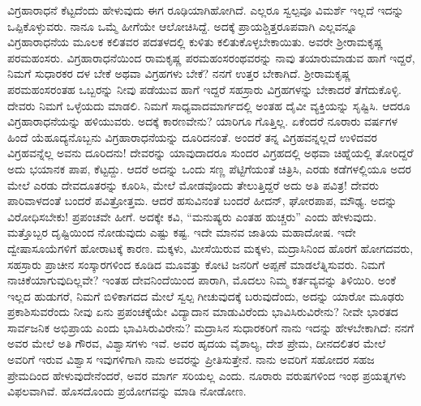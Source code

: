 ವಿಗ್ರಹಾರಾಧನೆ ಕೆಟ್ಟದೆಂದು ಹೇಳುವುದು ಈಗ ರೂಢಿಯಾಗಿಹೋಗಿದೆ. ಎಲ್ಲರೂ ಸ್ವಲ್ಪವೂ ವಿಮರ್ಶೆ ಇಲ್ಲದೆ ಇದನ್ನು ಒಪ್ಪಿಕೊಳ್ಳುವರು. ನಾನೂ ಒಮ್ಮೆ ಹೀಗೆಯೇ ಆಲೋಚಿಸಿದ್ದೆ. ಅದಕ್ಕೆ ಪ್ರಾಯಶ್ಚಿತ್ತರೂಪವಾಗಿ ಎಲ್ಲವನ್ನೂ ವಿಗ್ರಹಾ\-ರಾಧನೆಯ ಮೂಲಕ ಕಲಿತವರ ಪದತಳದಲ್ಲಿ ಕುಳಿತು ಕಲಿತುಕೊಳ್ಳಬೇಕಾಯಿತು. ಅವರೇ ಶ‍್ರೀರಾಮಕೃಷ್ಣ ಪರಮಹಂಸರು. ವಿಗ್ರಹಾರಾಧನೆ\-ಯಿಂದ ರಾಮಕೃಷ್ಣ ಪರಮಹಂಸರಂಥವರನ್ನು ನಾವು ತಯಾರುಮಾಡುವ ಹಾಗೆ ಇದ್ದರೆ, ನಿಮಗೆ ಸುಧಾರಕರ ದಳ ಬೇಕೆ ಅಥವಾ ವಿಗ್ರಹಗಳು ಬೇಕೆ? ನನಗೆ ಉತ್ತರ ಬೇಕಾಗಿದೆ. ಶ‍್ರೀರಾಮಕೃಷ್ಣ ಪರಮಹಂಸರಂತಹ ಒಬ್ಬರನ್ನು ನೀವು ಪಡೆಯುವ ಹಾಗೆ ಇದ್ದರೆ ಸಹಸ್ರಾರು ವಿಗ್ರಹಗಳನ್ನು ಬೇಕಾದರೆ ತೆಗೆದು\-ಕೊಳ್ಳಿ. ದೇವರು ನಿಮಗೆ ಒಳ್ಳೆಯದು ಮಾಡಲಿ. ನಿಮಗೆ ಸಾಧ್ಯವಾದ\break ಮಾರ್ಗದಲ್ಲಿ ಅಂತಹ ದೈವೀ ವ್ಯಕ್ತಿಯನ್ನು ಸೃಷ್ಟಿಸಿ. ಆದರೂ ವಿಗ್ರಹಾರಾಧನೆ\-ಯನ್ನು ಹಳಿಯುವರು. ಅದಕ್ಕೆ ಕಾರಣವೇನು? ಯಾರಿಗೂ ಗೊತ್ತಿಲ್ಲ. ಏಕೆಂದರೆ ನೂರಾರು ವರ್ಷಗಳ ಹಿಂದೆ ಯೆಹೂದ್ಯನೊಬ್ಬನು ವಿಗ್ರಹಾರಾಧನೆಯನ್ನು ದೂರಿದನಂತೆ. ಅಂದರೆ ತನ್ನ ವಿಗ್ರಹವನ್ನಲ್ಲದೆ ಉಳಿದವರ ವಿಗ್ರಹವನ್ನೆಲ್ಲ ಅವನು ದೂರಿದನು! ದೇವರನ್ನು ಯಾವುದಾದರೂ ಸುಂದರ ವಿಗ್ರಹದಲ್ಲಿ ಅಥವಾ ಚಿಹ್ನೆಯಲ್ಲಿ ತೋರಿದ್ದರೆ ಅದು ಭಯಾನಕ ಪಾಪ, ಕೆಟ್ಟದ್ದು. ಆದರೆ ಅದನ್ನು ಒಂದು ಸಣ್ಣ ಪೆಟ್ಟಿಗೆಯಂತೆ ಚಿತ್ರಿಸಿ, ಎರಡು ಕಡೆಗಳಲ್ಲಿಯೂ ಅದರ ಮೇಲೆ ಎರಡು ದೇವದೂತರನ್ನು ಕೂರಿಸಿ, ಮೇಲೆ ಮೋಡವೊಂದು ತೇಲುತ್ತಿದ್ದರೆ ಅದು ಅತಿ ಪವಿತ್ರ! ದೇವರು ಪಾರಿವಾಳದಂತೆ ಬಂದರೆ ಪವಿತ್ರೋತ್ತಮ. ಆದರೆ ಹಸುವಿನಂತೆ ಬಂದರೆ ಹೀದನ್​, ಘೋರಪಾಪ, ಮೌಢ್ಯ. ಅದನ್ನು ವಿರೋಧಿಸಬೇಕು! ಪ್ರಪಂಚವೇ ಹೀಗೆ. ಅದಕ್ಕೇ ಕವಿ, “ಮನುಷ್ಯರು ಎಂತಹ ಹುಚ್ಚರು” ಎಂದು ಹೇಳುವುದು. ಮತ್ತೊಬ್ಬರ ದೃಷ್ಟಿಯಿಂದ ನೋಡುವುದು ಎಷ್ಟು ಕಷ್ಟ. ಇದೇ ಮಾನವ ಜಾತಿಯ ಮಹಾದೋಷ. ಇದೇ ದ್ವೇಷಾಸೂಯೆಗಳಿಗೆ ಹೋರಾಟಕ್ಕೆ ಕಾರಣ. ಮಕ್ಕಳು, ಮೀಸೆಯಿರುವ ಮಕ್ಕಳು, ಮದ್ರಾಸಿನಿಂದ ಹೊರಗೆ ಹೋಗದವರು, ಸಹಸ್ರಾರು ಪ್ರಾಚೀನ ಸಂಸ್ಕಾರಗಳಿಂದ ಕೂಡಿದ ಮೂವತ್ತು ಕೋಟಿ ಜನರಿಗೆ ಅಪ್ಪಣೆ ಮಾಡಲೆತ್ನಿಸುವರು. ನಿಮಗೆ ನಾಚಿಕೆ\-ಯಾಗುವುದಿಲ್ಲವೇ? ಇಂತಹ ದೇವನಿಂದೆಯಿಂದ ಪಾರಾಗಿ, ಮೊದಲು ನಿಮ್ಮ ಕರ್ತವ್ಯವನ್ನು ತಿಳಿಯಿರಿ. ಅಂಕೆ ಇಲ್ಲದ ಹುಡುಗರೆ, ನಿಮಗೆ ಬಿಳಿಕಾಗದದ ಮೇಲೆ ಸ್ವಲ್ಪ ಗೀಚುವುದಕ್ಕೆ ಬರುವುದೆಂದು, ಅದನ್ನು ಯಾರೋ ಮೂಢರು ಪ್ರಕಾಶಿಸುವರೆಂದು ನೀವು ಏನು ಪ್ರಪಂಚಕ್ಕೆಯೇ ವಿದ್ಯಾದಾನ ಮಾಡುವಿರೆಂದು ಭಾವಿಸಿರುವಿರೇನು? ನೀವೇ ಭಾರತದ ಸಾರ್ವಜನಿಕ ಅಭಿಪ್ರಾಯ ಎಂದು ಭಾವಿಸಿರುವಿರೇನು? ಮದ್ರಾಸಿನ ಸುಧಾರಕರಿಗೆ ನಾನು ಇದನ್ನು ಹೇಳಬೇಕಾಗಿದೆ: ನನಗೆ ಅವರ ಮೇಲೆ ಅತಿ ಗೌರವ, ವಿಶ್ವಾಸಗಳು ಇವೆ. ಅವರ ಹೃದಯ ವೈಶಾಲ್ಯ, ದೇಶ ಪ್ರೇಮ, ದೀನದಲಿತರ ಮೇಲೆ ಅವರಿಗೆ ಇರುವ ವಿಶ್ವಾಸ ಇವುಗಳಿಗಾಗಿ ನಾನು ಅವರನ್ನು ಪ್ರೀತಿಸುತ್ತೇನೆ. ನಾನು ಅವರಿಗೆ ಸಹೋದರ ಸಹಜ ಪ್ರೇಮದಿಂದ ಹೇಳುವುದೇನೆಂದರೆ, ಅವರ ಮಾರ್ಗ ಸರಿಯಲ್ಲ ಎಂದು. ನೂರಾರು ವರುಷಗಳಿಂದ ಇಂಥ ಪ್ರಯತ್ನಗಳು ವಿಫಲವಾಗಿವೆ. ಹೊಸದೊಂದು ಪ್ರಯೋಗವನ್ನು ಮಾಡಿ ನೋಡೋಣ.


